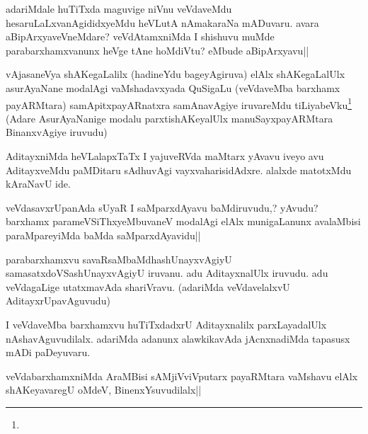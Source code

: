 
\begin{artha}
adariMdale huTiTxda maguvige niVnu veVdaveMdu 
hesaruLaLxvanAgididxyeMdu heVLutA nAmakaraNa mADuvaru. avara 
aBipArxyaveVneMdare? veVdAtamxniMda I shishuvu muMde 
parabarxhamxvanunx heVge tAne hoMdiVtu? eMbude aBipArxyavu||
\end{artha}


\begin{artha}
vAjasaneVya shAKegaLalilx (hadineYdu bageyAgiruva) elAlx shAKegaLalUlx 
asurAyaNane modalAgi vaMshadavxyada QuSigaLu (veVdaveMba barxhamx 
payARMtara) samApitxpayARnatxra samAnavAgiye iruvareMdu 
tiLiyabeVku\footnote[1]{} (Adare AsurAyaNanige modalu 
parxtishAKeyalUlx manuSayxpayARMtara BinanxvAgiye iruvudu)
\end{artha}


\begin{artha}
AditayxniMda heVLalapxTaTx I yajuveRVda maMtarx yAvavu iveyo avu 
AditayxveMdu paMDitaru sAdhuvAgi vayxvaharisidAdxre. alalxde matotxMdu 
kAraNavU ide.
\end{artha}

\begin{artha}
veVdasavxrUpanAda sUyaR I saMparxdAyavu baMdiruvudu,? yAvudu? barxhamx 
parameVSiThxyeMbuvaneV modalAgi elAlx munigaLanunx avalaMbisi 
paraMpareyiMda baMda saMparxdAyavidu||
\end{artha}

\begin{artha}
parabarxhamxvu savaRsaMbaMdhashUnayxvAgiyU samasatxdoVSashUnayxvAgiyU 
iruvanu. adu AditayxnalUlx iruvudu. adu veVdagaLige utatxmavAda 
shariVravu. (adariMda veVdavelalxvU AditayxrUpavAguvudu)
\end{artha}

\begin{artha}
I veVdaveMba barxhamxvu huTiTxdadxrU Aditayxnalilx parxLayadalUlx 
nAshavAguvudilalx. adariMda adanunx alawkikavAda jAcnxnadiMda tapasusx 
mADi paDeyuvaru.
\end{artha}

\begin{artha}
veVdabarxhamxniMda AraMBisi sAMjiVviVputarx payaRMtara vaMshavu elAlx 
shAKeyavaregU oMdeV, BinenxYsuvudilalx||
\end{artha}

